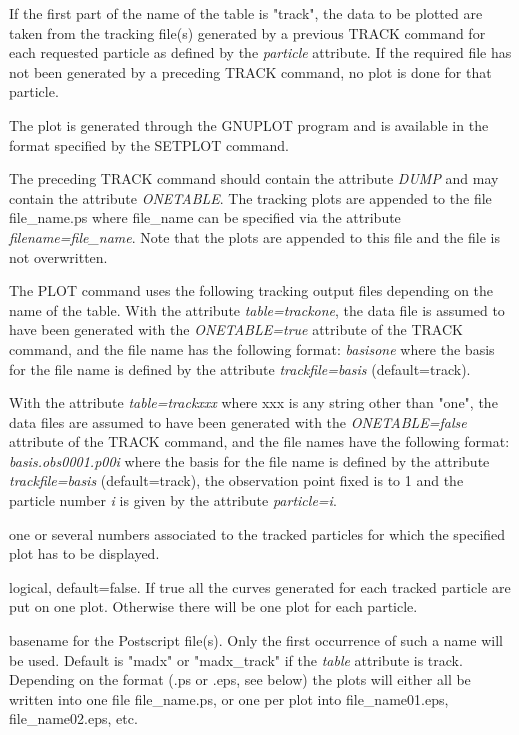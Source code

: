 \begin{madlist}
     If the first part of the name of the table is "track", the
     data to be plotted are taken from the tracking file(s) generated by
     a previous TRACK command for each requested particle as defined by
     the \textit{particle} attribute. If the required file has not been
     generated by a preceding TRACK command, no plot is done for that
     particle.   

     The plot is generated through the GNUPLOT program and is available
     in the format specified by the SETPLOT command. 

     The preceding TRACK command should contain the attribute \textit{DUMP}
     and may contain the attribute \textit{ONETABLE}. The tracking plots
     are appended to the file file\_name.ps where file\_name can be
     specified via the attribute \textit{filename=file\_name}. Note that
     the plots are appended to this file and the file is not
     overwritten. 

     The PLOT command uses the following tracking output files depending on
     the name of the table.  
     With the attribute \textit{table=trackone}, the data file is assumed
     to have been generated with the \textit{ONETABLE=true} attribute of
     the TRACK command, and the file name has the following format: 
     \textit{basisone} where the basis for the file name is defined by the
     attribute \textit{trackfile=basis} (default=track).

     With the attribute \textit{table=trackxxx} where xxx is any string
     other than "one", the data files are assumed to have been generated
     with the \textit{ONETABLE=false} attribute of the TRACK command, and
     the file names have the following format: \textit{basis.obs0001.p00i}
     where the basis for the file name is defined by the attribute
     \textit{trackfile=basis} (default=track), the observation point fixed
     is to 1 and the particle number \textit{i} is given by the attribute
     \textit{particle=i}. 
 
    one or several numbers associated to the tracked
     particles for which the specified plot has to be displayed.  

    logical, default=false. If true all the curves
     generated for each tracked particle are put on one plot. Otherwise
     there will be one plot for each particle.   

    basename for the Postscript
     file(s). Only the first occurrence of such a name will be
     used. Default is "madx" or "madx\_track" if the \textit{table}
     attribute is track.  Depending on the format (.ps or .eps, see
     below) the plots will either all be written into one file
     file\_name.ps, or one per plot into file\_name01.eps,
     file\_name02.eps, etc.   


\end{madlist}
